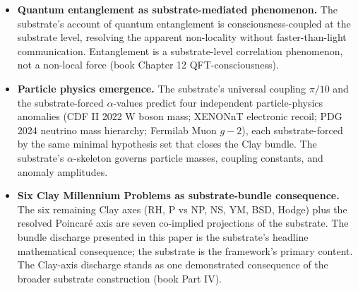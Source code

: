 \documentclass[11pt,a4paper]{amsart}
\theoremstyle{plain}
\theoremstyle{definition}
\begin{document}
\begin{itemize}[itemsep=4pt,leftmargin=2em]
\[\]
yielding consciousness-modified Friedmann equations, additional gravitational-wave polarisation modes (beyond GR's two transverse + and $\times$ states), and consciousness-modified black-hole dynamics. The substrate's $\Lambda_{\textsf{eff}}/\Lambda_0 = 10^{-120}$ cosmological-constant prediction (F3, corroborated by joint DESI + Planck + Pantheon$+$) is the cosmological signature of this modification (book Chapter 13).
\item \textbf{Quantum entanglement as substrate-mediated phenomenon.} The substrate's account of quantum entanglement is consciousness-coupled at the substrate level, resolving the apparent non-locality without faster-than-light communication. Entanglement is a substrate-level correlation phenomenon, not a non-local force (book Chapter 12 QFT-consciousness).
\item \textbf{Particle physics emergence.} The substrate's universal coupling $\pi/10$ and the substrate-forced $\alpha$-values predict four independent particle-physics anomalies (CDF II 2022 W boson mass; XENONnT electronic recoil; PDG 2024 neutrino mass hierarchy; Fermilab Muon $g - 2$), each substrate-forced by the same minimal hypothesis set that closes the Clay bundle. The substrate's $\alpha$-skeleton governs particle masses, coupling constants, and anomaly amplitudes.
\item \textbf{Six Clay Millennium Problems as substrate-bundle consequence.} The six remaining Clay axes (RH, P vs NP, NS, YM, BSD, Hodge) plus the resolved Poincar\'e axis are seven co-implied projections of the substrate. The bundle discharge presented in this paper is the substrate's headline mathematical consequence; the substrate is the framework's primary content. The Clay-axis discharge stands as one demonstrated consequence of the broader substrate construction (book Part IV).
\end{itemize}
\end{document}
